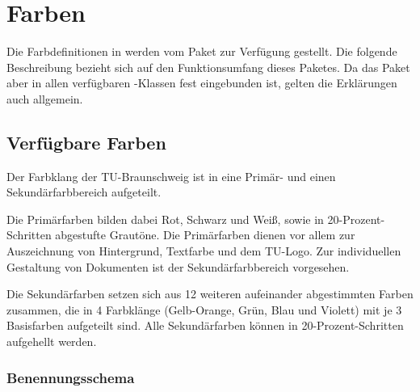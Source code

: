 \chapter{Farben}\label{sec:tubscolors}

\newcommand{\classoptionitem}[1][ ]{
  \item[\mdseries{\ttfamily%
    \textbackslash usepackage%
    {[{\color{tuRed}#1}]}%
    \{tubslogo\}}]\hfill\\
}

Die Farbdefinitionen in \tubslatex werden vom Paket 
zur Verfügung gestellt. Die folgende Beschreibung bezieht sich
auf den Funktionsumfang dieses Paketes.
Da das Paket aber in allen verfügbaren \tubslatex-Klassen fest eingebunden ist,
gelten die Erklärungen auch allgemein.

\newcommand{\rainbow}[2][\relax]{{\noindent\sffamily\footnotesize%
\ifx#1\relax\colorlet{fglbg}{black}\else\colorlet{fglbg}{#1}\fi
\colorbox{#2100}{\hbox to 0.188\textwidth{%
  \color{fglbg}\vphantom{Fg}#2{}100\hfill}}%
\colorbox{#280}{\hbox to 0.188\textwidth{%
  \color{fglbg}\vphantom{Fg}#2{}80\hfill}}%
\colorbox{#260}{\hbox to 0.188\textwidth{\vphantom{Fg}#2{}60\hfill}}%
\colorbox{#240}{\hbox to 0.188\textwidth{\vphantom{Fg}#2{}40\hfill}}%
\colorbox{#220}{\hbox to 0.188\textwidth{\vphantom{Fg}#2{}20\hfill}}\\%
}}

\section{Verfügbare Farben}

Der Farbklang der TU-Braunschweig ist in eine Primär- und einen
Sekundärfarbbereich aufgeteilt.

Die Primärfarben bilden dabei Rot, Schwarz und Weiß, sowie in
20-Prozent-Schritten abgestufte Grautöne. Die Primärfarben dienen
vor allem zur Auszeichnung von Hintergrund, Textfarbe und dem TU-Logo.
Zur individuellen Gestaltung von Dokumenten ist der Sekundärfarbbereich
vorgesehen.

Die Sekundärfarben setzen sich aus 12 weiteren aufeinander abgestimmten
Farben zusammen, die 
in 4 Farbklänge (Gelb-Orange, Grün, Blau und Violett) mit je 3 Basisfarben
aufgeteilt sind.
Alle Sekundärfarben können in 20-Prozent-Schritten aufgehellt werden.

\subsection{Benennungsschema}

